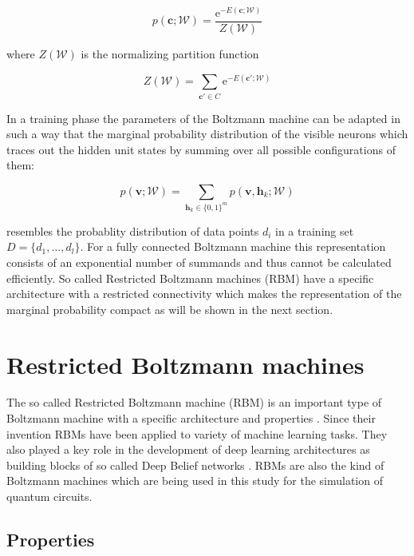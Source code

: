 \begin{equation}
   p(\bm{c};\mathcal{W}) = \frac{\mathrm{e}^{-E(\bm{c};\mathcal{W})}}{Z(\mathcal{W})}
\end{equation}

where $Z(\mathcal{W})$ is the normalizing partition function 

\begin{equation}
   Z(\mathcal{W}) = \sum_{\bm{c}\prime\in C} \mathrm{e}^{-E(\bm{c}\prime;\mathcal{W})}
\end{equation}

In a training phase the parameters of the Boltzmann machine can be adapted in such a way that 
the marginal probability distribution of the visible neurons which traces out the hidden unit 
states by summing over all possible configurations of them:

\begin{equation}
   p(\bm{v};\mathcal{W}) = \sum_{\bm{h}_k \in \{0,1\}^m} p(\bm{v},\bm{h}_k;\mathcal{W})
\end{equation}

resembles the probablity distribution of data points $d_i$ in a training set $D=\{d_1,\dots,d_l\}$.
For a fully connected Boltzmann machine this representation consists of an exponential number of 
summands and thus cannot be calculated efficiently. So called Restricted Boltzmann machines
(RBM) have a specific architecture with a restricted connectivity which makes the representation 
of the marginal probability compact as will be shown in the next section.

\section{Restricted Boltzmann machines}
The so called Restricted Boltzmann machine (RBM) is an important type of Boltzmann machine with 
a specific architecture and properties \cite{smolensky1986information}. Since their invention RBMs have been applied to variety 
of machine learning tasks. They also played a 
key role in the development of deep learning architectures as building blocks of so called 
Deep Belief networks \cite{bengio2009learning, hinton2006fast}.
RBMs are also the kind of Boltzmann machines which are being used in this study for the simulation 
of quantum circuits.

\subsection{Properties}


